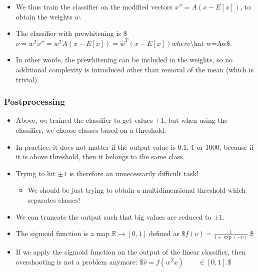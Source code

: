 \documentclass[letterpaper,10pt,english]{jupyterBook}
\begin{document}
\begin{itemize}
\item {} 
\sphinxAtStartPar
We thus train the classifier on the modified vectors
\(x''=A(x-E[x])\), to obtain the weights \(w\).

\item {} 
\sphinxAtStartPar
The classifier with pre\sphinxhyphen{}whitening is
\$\(\nu=w^T x''=w^T A(x-E[x]) = \hat w^T (x-E[x])\)\( where \)\textbackslash{}hat w=Aw\$.

\item {} 
\sphinxAtStartPar
In other words, the pre\sphinxhyphen{}whitening can be included in the weights, so
no additional complexity is introduced other than removal of the
mean (which is trivial).

\end{itemize}

\sphinxAtStartPar
{}


\subsubsection{Post\sphinxhyphen{}processing}
\label{\detokenize{Recognition/Voice_activity_detection:id1}}
\sphinxAtStartPar
{}
\begin{itemize}
\item {} 
\sphinxAtStartPar
Above, we trained the classifier to get values \(\pm1\), but when
using the classifier, we choose classes based on a threshold.

\item {} 
\sphinxAtStartPar
In practice, it does not matter if the output value is \(0.1\), \(1\) or
\(1000\), because if it is above threshold, then it belongs to the
same class.

\item {} 
\sphinxAtStartPar
Trying to hit \(\pm1\) is therefore an unnecessarily difficult task!
\begin{itemize}
\item {} 
\sphinxAtStartPar
We should be just trying to obtain a multidimensional threshold
which separates classes!

\end{itemize}

\item {} 
\sphinxAtStartPar
We can truncate the output such that big values are reduced to
\(\pm1\).

\item {} 
\sphinxAtStartPar
The sigmoid function is a map \({\mathbb R}\rightarrow[0,1]\) defined
as \$\(f(\nu) = \frac1{1+\exp(-\nu)}.\)\$

\item {} 
\sphinxAtStartPar
If we apply the sigmoid function on the output of the linear
classifier, then overshooting is not a problem anymore:
\$\(\hat \nu = f(w^T x) \qquad\in[0,1].\)\$

\end{itemize}
\end{document}
